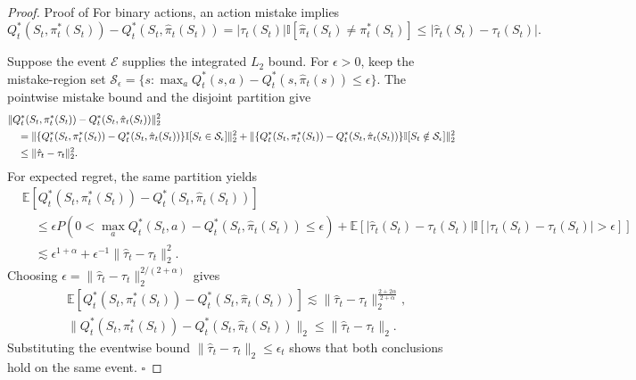 \documentclass[10pt,a4paper]{amsart}
\newcommand{\E}{\mathbb{E}}
\newcommand{\abs}[1]{\left|#1\right|}
\newcommand{\blipadv}{\tau}
\newcommand{\norm}[1]{\lVert#1\rVert}
\renewcommand{\qed}{\unskip\nobreak\hfill\ensuremath{\square}}
\begin{document}
\begin{proof}{Proof of }
For binary actions, an action mistake implies
\[
Q_t^*(S_t,\pi_t^*(S_t))-Q_t^*(S_t,\hat\pi_t(S_t))
=\abs{\blipadv_t(S_t)}\mathbb I[\hat\pi_t(S_t)\ne\pi_t^*(S_t)]
\leq\abs{\hat\blipadv_t(S_t)-\blipadv_t(S_t)}.
\]

Suppose the event $\mathcal E$ supplies the integrated $L_2$ bound. For
$\epsilon>0$, keep
the mistake-region set
$\mathcal S_\epsilon=
\{s:\max_a Q_t^*(s,a)-Q_t^*(s,\hat\pi_t(s))\le\epsilon\}$.
The pointwise mistake bound and the disjoint partition give
\begin{align}
&\norm{
Q_t^*(S_t,\pi_t^*(S_t))-Q_t^*(S_t,\hat\pi_t(S_t))
}_2^2\notag\\
&\quad=
\norm{
\{Q_t^*(S_t,\pi_t^*(S_t))-Q_t^*(S_t,\hat\pi_t(S_t))\}
\mathbb I[S_t\in\mathcal S_\epsilon]
}_2^2\notag+
\norm{
\{Q_t^*(S_t,\pi_t^*(S_t))-Q_t^*(S_t,\hat\pi_t(S_t))\}
\mathbb I[S_t\notin\mathcal S_\epsilon]
}_2^2\notag\\
&\quad
\le
\norm{\hat\blipadv_t-\blipadv_t}_2^2.
\label{eqn-mistakeregion-ltwo}
\end{align}
For expected regret, the same partition yields
\begin{align*}
&\E[
Q_t^*(S_t,\pi_t^*(S_t))-Q_t^*(S_t,\hat\pi_t(S_t))
]\\
&\quad\leq
\epsilon
P\!\left(
0<\max_a Q_t^*(S_t,a)-Q_t^*(S_t,\hat\pi_t(S_t))
\le\epsilon
\right)
+
\E[
\abs{\hat\blipadv_t(S_t)-\blipadv_t(S_t)}
\mathbb I[\abs{\hat\blipadv_t(S_t)-\blipadv_t(S_t)}
>\epsilon]
]\\
&\quad\lesssim
\epsilon^{1+\alpha}
+\epsilon^{-1}
\norm{\hat\blipadv_t-\blipadv_t}_2^2.
\end{align*}
Choosing
$\epsilon=\norm{\hat\blipadv_t-\blipadv_t}_2^{2/(2+\alpha)}$
gives
\begin{align*}
&\E[
Q_t^*(S_t,\pi_t^*(S_t))-Q_t^*(S_t,\hat\pi_t(S_t))
] \lesssim
\norm{\hat\blipadv_t-\blipadv_t}_2^
{\frac{2+2\alpha}{2+\alpha}},\\
&\norm{
Q_t^*(S_t,\pi_t^*(S_t))-Q_t^*(S_t,\hat\pi_t(S_t))
}_2\leq
\norm{\hat\blipadv_t-\blipadv_t}_2.
\end{align*}
Substituting the eventwise bound
$\norm{\hat\blipadv_t-\blipadv_t}_2\leq\epsilon_t$
shows that both conclusions hold on the same event. \qed
\end{proof}
\end{document}
